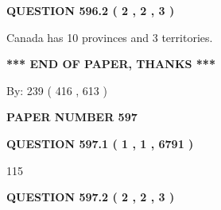 \documentclass[12pt]{article}
\begin{document}
\vspace{0.2in}
  
{\textbf{\Large{QUESTION
596.2 
 ( 2 , 2 , 3 )
}}}
  
  
 
 
\noindent{}
 
 
Canada has 10  provinces and 3 territories.
 
 
 
 
   
   
 \vspace{0.2in}
 
   
   
   
   
\vspace{1.0in} 
{\textbf{\large{ *** END OF PAPER, THANKS *** }}} 
   
   
\hspace{1.0in} By: 
 239 ( 416 ,  613 )
   
   
   
   
\newpage 
\setcounter{page}{ 
   597001 } 
   
   
   
   
 {\textbf{ \Large{ PAPER NUMBER  597  }}}
   
   
\vspace{0.2in}
   
   
   
   
   
   
 \vspace{0.2in}
 
 
 
 
   
   
  
\vspace{0.2in}
  
{\textbf{\Large{QUESTION
597.1 
 ( 1 , 1 , 6791 )
}}}
  
  
 
 
\noindent{}

115
 
 
  
\vspace{0.2in}
  
{\textbf{\Large{QUESTION
597.2 
 ( 2 , 2 , 3 )
}}}
  
  
 
\end{document}
